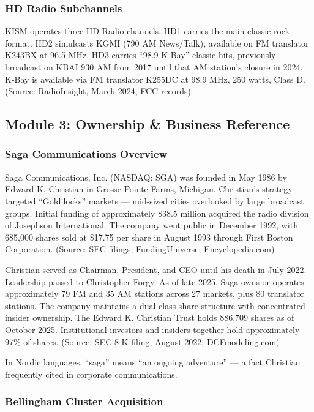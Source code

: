 \documentclass[11pt,letterpaper]{article}
\begin{document}
\subsubsection{HD Radio Subchannels}

KISM operates three HD Radio channels. HD1 carries the main classic rock format. HD2 simulcasts KGMI (790 AM News/Talk), available on FM translator K243BX at 96.5 MHz. HD3 carries ``98.9 K-Bay'' classic hits, previously broadcast on KBAI 930 AM from 2017 until that AM station's closure in 2024. K-Bay is available via FM translator K255DC at 98.9 MHz, 250 watts, Class D. (Source: RadioInsight, March 2024; FCC records)

\subsection{Module 3: Ownership \& Business Reference}

\subsubsection{Saga Communications Overview}

Saga Communications, Inc. (NASDAQ: SGA) was founded in May 1986 by Edward K. Christian in Grosse Pointe Farms, Michigan. Christian's strategy targeted ``Goldilocks'' markets --- mid-sized cities overlooked by large broadcast groups. Initial funding of approximately \$38.5 million acquired the radio division of Josephson International. The company went public in December 1992, with 685,000 shares sold at \$17.75 per share in August 1993 through First Boston Corporation. (Source: SEC filings; FundingUniverse; Encyclopedia.com)

Christian served as Chairman, President, and CEO until his death in July 2022. Leadership passed to Christopher Forgy. As of late 2025, Saga owns or operates approximately 79 FM and 35 AM stations across 27 markets, plus 80 translator stations. The company maintains a dual-class share structure with concentrated insider ownership. The Edward K. Christian Trust holds 886,709 shares as of October 2025. Institutional investors and insiders together hold approximately 97\% of shares. (Source: SEC 8-K filing, August 2022; DCFmodeling.com)

In Nordic languages, ``saga'' means ``an ongoing adventure'' --- a fact Christian frequently cited in corporate communications.

\subsubsection{Bellingham Cluster Acquisition}
\end{document}
